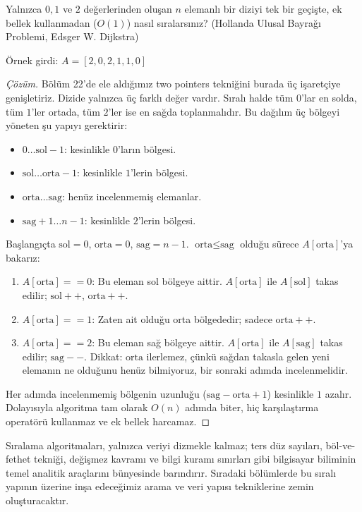 \begin{example}
Yalnızca $0, 1$ ve $2$ değerlerinden oluşan $n$ elemanlı bir diziyi tek bir geçişte, ek bellek kullanmadan ($O(1)$) nasıl sıralarsınız? (Hollanda Ulusal Bayrağı Problemi, Edsger W. Dijkstra)

Örnek girdi: $A = [2, 0, 2, 1, 1, 0]$
\end{example}

\begin{proof}[Çözüm]
Bölüm 22'de ele aldığımız two pointers tekniğini burada üç işaretçiye genişletiriz. Dizide yalnızca üç farklı değer vardır. Sıralı halde tüm $0$'lar en solda, tüm $1$'ler ortada, tüm $2$'ler ise en sağda toplanmalıdır. Bu dağılım üç bölgeyi yöneten şu yapıyı gerektirir:
\begin{itemize}
    \item $0 \dots \text{sol}-1$: kesinlikle $0$'ların bölgesi.
    \item $\text{sol} \dots \text{orta}-1$: kesinlikle $1$'lerin bölgesi.
    \item $\text{orta} \dots \text{sag}$: henüz incelenmemiş elemanlar.
    \item $\text{sag}+1 \dots n-1$: kesinlikle $2$'lerin bölgesi.
\end{itemize}

Başlangıçta $\text{sol} = 0$, $\text{orta} = 0$, $\text{sag} = n - 1$.
$\text{orta} \le \text{sag}$ olduğu sürece $A[\text{orta}]$'ya bakarız:
\begin{enumerate}
    \item $A[\text{orta}] == 0$: Bu eleman sol bölgeye aittir. $A[\text{orta}]$ ile $A[\text{sol}]$ takas edilir; $\text{sol}++$, $\text{orta}++$.
    \item $A[\text{orta}] == 1$: Zaten ait olduğu orta bölgededir; sadece $\text{orta}++$.
    \item $A[\text{orta}] == 2$: Bu eleman sağ bölgeye aittir. $A[\text{orta}]$ ile $A[\text{sag}]$ takas edilir; $\text{sag}--$. Dikkat: $\text{orta}$ ilerlemez, çünkü sağdan takasla gelen yeni elemanın ne olduğunu henüz bilmiyoruz, bir sonraki adımda incelenmelidir.
\end{enumerate}

Her adımda incelenmemiş bölgenin uzunluğu ($\text{sag} - \text{orta} + 1$) kesinlikle $1$ azalır. Dolayısıyla algoritma tam olarak $O(n)$ adımda biter, hiç karşılaştırma operatörü kullanmaz ve ek bellek harcamaz.
\end{proof}

Sıralama algoritmaları, yalnızca veriyi dizmekle kalmaz; ters düz sayıları, böl-ve-fethet tekniği, değişmez kavramı ve bilgi kuramı sınırları gibi bilgisayar biliminin temel analitik araçlarını bünyesinde barındırır. Sıradaki bölümlerde bu sıralı yapının üzerine inşa edeceğimiz arama ve veri yapısı tekniklerine zemin oluşturacaktır.
